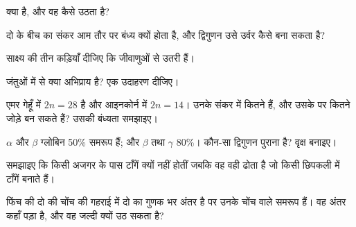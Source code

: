 \begin{exercise}[$\star$]\label{exo:g12:diversification-of-life:2}
 क्या है, और वह कैसे उठता है?
\end{exercise}

\begin{exercise}[$\star$]\label{exo:g12:diversification-of-life:3}
दो  के बीच का संकर आम तौर पर बंध्य क्यों होता है, और 
द्विगुणन उसे उर्वर कैसे बना सकता है?
\end{exercise}

\begin{exercise}[$\star$]\label{exo:g12:diversification-of-life:4}
साक्ष्य की तीन कड़ियाँ दीजिए कि  जीवाणुओं से उतरी हैं।
\end{exercise}

\begin{exercise}[$\star$]\label{exo:g12:diversification-of-life:5}
जंतुओं में  से क्या अभिप्राय है? एक उदाहरण दीजिए।
\end{exercise}

\begin{exercise}[$\star\star$]\label{exo:g12:diversification-of-life:6}
एमर गेहूँ में $2n = 28$ है और आइनकोर्न में $2n = 14$। उनके संकर में कितने
 हैं, और उसके  पर कितने जोड़े बन सकते हैं? उसकी
बंध्यता समझाइए।
\end{exercise}

\begin{exercise}[$\star\star$]\label{exo:g12:diversification-of-life:7}
$\alpha$ और $\beta$ ग्लोबिन  50\% समरूप हैं; और $\beta$ तथा $\gamma$ 
80\%। कौन-सा द्विगुणन पुराना है? वृक्ष बनाइए।
\end{exercise}

\begin{exercise}[$\star\star$]\label{exo:g12:diversification-of-life:8}
समझाइए कि किसी अजगर के पास टाँगें क्यों नहीं होतीं जबकि वह वही  ढोता है
जो किसी छिपकली में टाँगें बनाते हैं।
\end{exercise}

\begin{exercise}[$\star\star$]\label{exo:g12:diversification-of-life:9}
फिंच की दो  की चोंच की गहराई में दो का गुणक भर अंतर है पर उनके चोंच
वाले  समरूप हैं। वह अंतर कहाँ पड़ा है, और वह जल्दी क्यों उठ सकता है?
\end{exercise}

